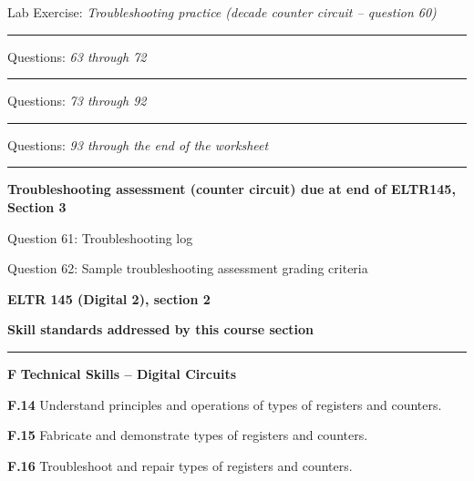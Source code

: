 \hskip 10pt Lab Exercise: {\it Troubleshooting practice (decade counter circuit -- question 60)}
  
\vskip 10pt
\hrule \vskip 5pt
\noindent
{}

\hskip 10pt Questions: {\it 63 through 72}
 
\vskip 10pt
\hrule \vskip 5pt
\noindent
{}

\hskip 10pt Questions: {\it 73 through 92}
 
\vskip 10pt

\hrule \vskip 5pt
\noindent
{}

\hskip 10pt Questions: {\it 93 through the end of the worksheet}
 
\vskip 10pt
\hrule \vskip 5pt
\noindent
{}

\hskip 10pt {\bf Troubleshooting assessment (counter circuit) due at end of ELTR145, Section 3}

\hskip 10pt Question 61: Troubleshooting log
 
\hskip 10pt Question 62: Sample troubleshooting assessment grading criteria
 
\vskip 10pt







\vfil \eject

\centerline{\bf ELTR 145 (Digital 2), section 2} \bigskip 
 
\vskip 10pt

\noindent
{\bf Skill standards addressed by this course section}

\vskip 5pt

\hrule \vskip 10pt
\noindent
{}

\vskip 5pt

\medskip
\item{\bf F} {\bf Technical Skills -- Digital Circuits}
\item{\bf F.14} Understand principles and operations of types of registers and counters. 
\item{\bf F.15} Fabricate and demonstrate types of registers and counters. 
\item{\bf F.16} Troubleshoot and repair types of registers and counters. 
\medskip

